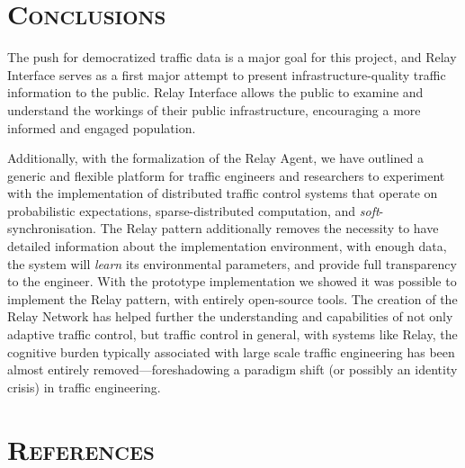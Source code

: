 \documentclass[a4paper,10pt]{article}
\begin{document}
\begin{multicols}{2}
\section{\textsc{Conclusions}}
The push for democratized traffic data is a major goal for this project, and Relay Interface serves as a first major attempt to present infrastructure-quality traffic information to the public. 
Relay Interface allows the public to examine and understand the workings of their public infrastructure, encouraging a more informed and engaged population.

Additionally, with the formalization of the Relay Agent, we have outlined a generic and flexible platform for traffic engineers and researchers to experiment with the implementation of distributed traffic control systems that operate on probabilistic expectations, sparse-distributed computation, and \emph{soft}-synchronisation.
The Relay pattern additionally removes the necessity to have detailed information about the implementation environment, with enough data, the system will \emph{learn} its environmental parameters, and provide full transparency to the engineer.
With the prototype implementation we showed it was possible to implement the Relay pattern, with entirely open-source tools.
The creation of the Relay Network has helped further the understanding and capabilities of not only adaptive traffic control, but traffic control in general, with systems like Relay, the cognitive burden typically associated with large scale traffic engineering has been almost entirely removed---foreshadowing a paradigm shift (or possibly an identity crisis) in traffic engineering.

\section{\textsc{References}}




\end{multicols}
\end{document}
